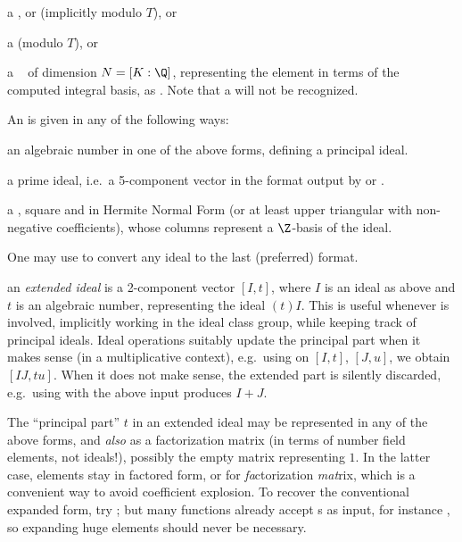 \item a ,  or  (implicitly modulo $T$), or

\item a  (modulo $T$), or

\item a ~ of dimension $N = [K:\Q]$, representing
the element in terms of the computed integral basis, as
. Note that a 
will not be recognized.
\medskip

\noindent An  is given in any of the following ways:

\item an algebraic number in one of the above forms, defining a principal ideal.

\item a prime ideal, i.e.~a 5-component vector in the format output by
 or .

\item a , square and in Hermite Normal Form (or at least
upper triangular with non-negative coefficients), whose columns represent a
$\Z$-basis of the ideal.

One may use  to convert any ideal to the last (preferred) format.

\item an \emph{extended ideal}  is a 2-component
vector $[I, t]$, where $I$ is an ideal as above and $t$ is an algebraic
number, representing the ideal $(t)I$. This is useful whenever 
is involved, implicitly working in the ideal class group, while keeping track
of principal ideals. Ideal operations suitably update the principal part
when it makes sense (in a multiplicative context), e.g.~using 
on $[I,t]$, $[J,u]$, we obtain $[IJ, tu]$. When it does not make sense, the
extended part is silently discarded, e.g.~using  with the above
input produces $I+J$.

The ``principal part'' $t$ in an extended ideal may be
represented in any of the above forms, and \emph{also} as a factorization
matrix (in terms of number field elements, not ideals!), possibly the empty
matrix \kbd{[;]} representing $1$. In the latter case, elements stay in
factored form, or  for \emph{fa}ctorization \emph{mat}rix, which
is a convenient way to avoid coefficient explosion. To recover the
conventional expanded form, try ; but many functions
already accept s as input, for instance , so
expanding huge elements should never be necessary.

